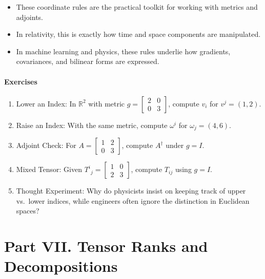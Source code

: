 \documentclass[
  letterpaper,
  DIV=11,
  numbers=noendperiod]{scrreprt}
\providecommand{\tightlist}{%
  \setlength{\itemsep}{0pt}\setlength{\parskip}{0pt}}
\begin{document}
\begin{itemize}
\tightlist
\item
  These coordinate rules are the practical toolkit for working with
  metrics and adjoints.
\item
  In relativity, this is exactly how time and space components are
  manipulated.
\item
  In machine learning and physics, these rules underlie how gradients,
  covariances, and bilinear forms are expressed.
\end{itemize}

\subsubsection{Exercises}\label{exercises-45}

\begin{enumerate}
\def\labelenumi{\arabic{enumi}.}
\item
  Lower an Index: In \(\mathbb{R}^2\) with metric
  \(g = \begin{bmatrix}2 & 0 \\ 0 & 3\end{bmatrix}\), compute \(v_i\)
  for \(v^j = (1,2)\).
\item
  Raise an Index: With the same metric, compute \(\omega^i\) for
  \(\omega_j = (4,6)\).
\item
  Adjoint Check: For \(A = \begin{bmatrix}1 & 2 \\ 0 & 3\end{bmatrix}\),
  compute \(A^\dagger\) under \(g = I\).
\item
  Mixed Tensor: Given
  \(T^i{}_j = \begin{bmatrix}1 & 0 \\ 2 & 3\end{bmatrix}\), compute
  \(T_{ij}\) using \(g = I\).
\item
  Thought Experiment: Why do physicists insist on keeping track of upper
  vs.~lower indices, while engineers often ignore the distinction in
  Euclidean spaces?
\end{enumerate}


\chapter{Part VII. Tensor Ranks and
Decompositions}\label{part-vii.-tensor-ranks-and-decompositions}
\end{document}
